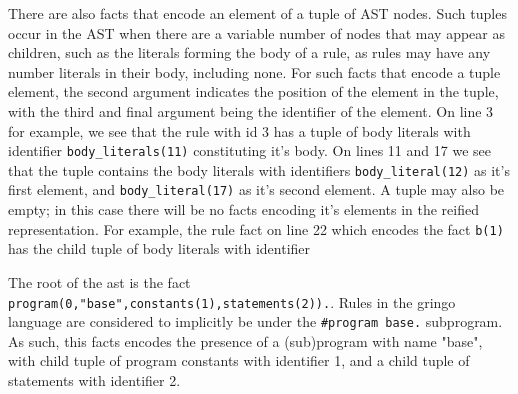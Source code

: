 There are also facts that encode an element of a tuple of AST
nodes. Such tuples occur in the AST when there are a variable number
of nodes that may appear as children, such as the literals forming the
body of a rule, as rules may have any number literals in their body,
including none. For such facts that encode a tuple element, the second
argument indicates the position of the element in the tuple, with the
third and final argument being the identifier of the element. On line
3 for example, we see that the rule with id 3 has a tuple of body
literals with identifier \verb|body_literals(11)| constituting it's
body. On lines 11 and 17 we see that the tuple contains the body
literals with identifiers \verb|body_literal(12)| as it's first
element, and \verb|body_literal(17)| as it's second element.  A tuple
may also be empty; in this case there will be no facts encoding it's
elements in the reified representation. For example, the rule fact on
line 22 which encodes the fact \verb|b(1)| has the child tuple of body
literals with identifier \verb||

The root of the ast is the fact
\verb|program(0,"base",constants(1),statements(2)).|. Rules in the
gringo language are considered to implicitly be under the
\verb|#program base.| subprogram\cite{karoscwa21a}. As such, this
facts encodes the presence of a (sub)program with name "base", with
child tuple of program constants with identifier 1, and a child tuple
of statements with identifier 2.

